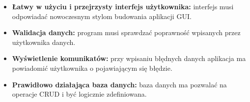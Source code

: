\begin{itemize}
    \item \textbf{Łatwy w użyciu i przejrzysty interfejs użytkownika:} interfejs musi odpowiadać nowoczesnym stylom budowania aplikacji GUI.
    \item \textbf{Walidacja danych:} program musi sprawdzać poprawność wpisanych przez użytkownika danych.
    \item \textbf{Wyświetlenie komunikatów:} przy wpisaniu błędnych danych aplikacja ma powiadomić użytkownika o pojawiającym się błędzie.
    \item \textbf{Prawidłowo działająca baza danych:} baza danych ma pozwalać na operacje CRUD i być logicznie zdefiniowana.
\end{itemize}

